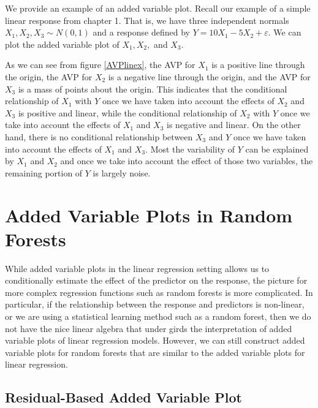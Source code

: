 \documentclass[12pt,twoside]{reedthesis}
\theoremstyle{definition}
\theoremstyle{definition}
\theoremstyle{definition}
\theoremstyle{remark}
\begin{document}
We provide an example of an added variable plot. Recall our example of a
simple linear response from chapter 1. That is, we have three
independent normals \(X_1,X_2,X_3\sim N(0,1)\) and a response defined by
\(Y=10X_1-5X_2+\varepsilon.\) We can plot the added variable plot of
\(X_1, X_2,\) and \(X_3\). \par

As we can see from figure \ref{AVPlinex}, the AVP for \(X_1\) is a
positive line through the origin, the AVP for \(X_2\) is a negative line
through the origin, and the AVP for \(X_3\) is a mass of points about
the origin. This indicates that the conditional relationship of \(X_1\)
with \(Y\) once we have taken into account the effects of \(X_2\) and
\(X_3\) is positive and linear, while the conditional relationship of
\(X_2\) with \(Y\) once we take into account the effects of \(X_1\) and
\(X_3\) is negative and linear. On the other hand, there is no
conditional relationship between \(X_3\) and \(Y\) once we have taken
into account the effects of \(X_1\) and \(X_3\). Most the variability of
\(Y\) can be explained by \(X_1\) and \(X_2\) and once we take into
account the effect of those two variables, the remaining portion of
\(Y\) is largely noise. \par

\section{Added Variable Plots in Random
Forests}\label{added-variable-plots-in-random-forests}

While added variable plots in the linear regression setting allows us to
conditionally estimate the effect of the predictor on the response, the
picture for more complex regression functions such as random forests is
more complicated. In particular, if the relationship between the
response and predictors is non-linear, or we are using a statistical
learning method such as a random forest, then we do not have the nice
linear algebra that under girds the interpretation of added variable
plots of linear regression models. However, we can still construct added
variable plots for random forests that are similar to the added variable
plots for linear regression. \par

\subsection{Residual-Based Added Variable
Plot}\label{residual-based-added-variable-plot}
\end{document}
